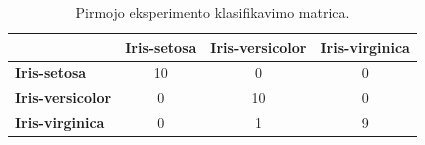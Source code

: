 \begin{table}[H]
    \centering
    \caption{Pirmojo eksperimento klasifikavimo matrica.}
    \begin{tabular}{|l|c|c|c|}
        \hline
        & \textbf{Iris-setosa} & \textbf{Iris-versicolor} & \textbf{Iris-virginica} \\
        \hline
        \textbf{Iris-setosa} & 10 & 0 & 0 \\ \hline
        \textbf{Iris-versicolor} & 0 & 10 & 0 \\ \hline
        \textbf{Iris-virginica} & 0 & 1 & 9 \\ \hline
    \end{tabular}
    \label{tab:eksperimento_nr_1_klasifikavimo_matrica}
\end{table}